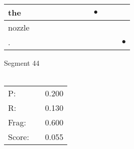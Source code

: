 \documentclass[landscape]{article}
\newcommand{\ssp}{\hspace{2pt}}
\newcommand{\mex}{\cellcolor{g}$\bullet$}
\begin{document}
\begin{tabular}{|l|p{10pt}|p{10pt}|p{10pt}|p{10pt}|p{10pt}|p{10pt}|p{10pt}|p{10pt}|p{10pt}|p{10pt}|p{10pt}|}
\hline
\ssp \cellcolor{ref7}the \ssp&\hspace{2pt}&\hspace{2pt}&\hspace{2pt}&\hspace{2pt}&\hspace{2pt}&\hspace{2pt}&\hspace{2pt}&\hspace{2pt}\mex&\hspace{2pt}&\hspace{2pt}&\hspace{2pt}\\
\hline
\ssp nozzle \ssp&\hspace{2pt}&\hspace{2pt}&\hspace{2pt}&\hspace{2pt}&\hspace{2pt}&\hspace{2pt}&\hspace{2pt}&\hspace{2pt}&\hspace{2pt}&\hspace{2pt}&\hspace{2pt}\\
\hline
\ssp \cellcolor{ref10}. \ssp&\hspace{2pt}&\hspace{2pt}&\hspace{2pt}&\hspace{2pt}&\hspace{2pt}&\hspace{2pt}&\hspace{2pt}&\hspace{2pt}&\hspace{2pt}&\hspace{2pt}&\hspace{2pt}\mex\\
\hline
\end{tabular}

\vspace{6pt}
\noindent Segment 44\\\\
\noindent\begin{tabular}{lm{12pt}r}
\hline
P:&&0.200\\
R:&&0.130\\
Frag:&&0.600\\
Score:&&0.055\\
\end{tabular}
\end{document}
